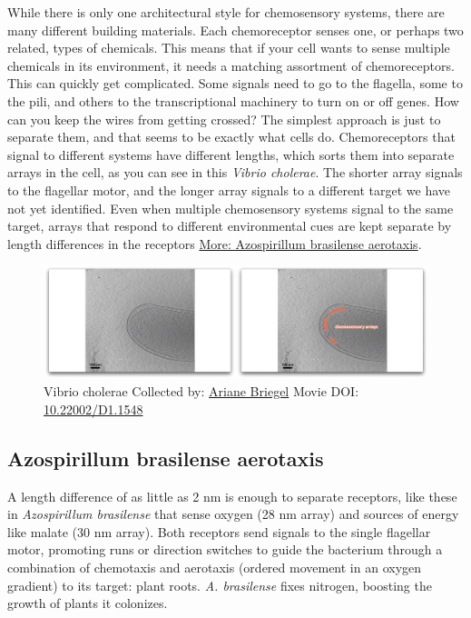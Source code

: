 \documentclass[]{tufte-book}
\begin{document}
While there is only one architectural style for chemosensory systems,
there are many different building materials. Each chemoreceptor senses
one, or perhaps two related, types of chemicals. This means that if your
cell wants to sense multiple chemicals in its environment, it needs a
matching assortment of chemoreceptors. This can quickly get complicated.
Some signals need to go to the flagella, some to the pili, and others to
the transcriptional machinery to turn on or off genes. How can you keep
the wires from getting crossed? The simplest approach is just to
separate them, and that seems to be exactly what cells do.
Chemoreceptors that signal to different systems have different lengths,
which sorts them into separate arrays in the cell, as you can see in
this \emph{Vibrio cholerae}. The shorter array signals to the flagellar
motor, and the longer array signals to a different target we have not
yet identified. Even when multiple chemosensory systems signal to the
same target, arrays that respond to different environmental cues are
kept separate by length differences in the receptors
\protect\hyperlink{Azospirillum_brasilense_aerotaxis}{More: Azospirillum
brasilense aerotaxis}.





\begin{figure}
\includegraphics{movie_stills/7_4} \caption[Vibrio cholerae Collected by:
\protect\hyperlink{ariane_briegel}{Ariane Briegel} Movie DOI:
\href{https://doi.org/10.22002/D1.1548}{10.22002/D1.1548}]{Vibrio cholerae Collected by:
\protect\hyperlink{ariane_briegel}{Ariane Briegel} Movie DOI:
\href{https://doi.org/10.22002/D1.1548}{10.22002/D1.1548}}\label{fig:7-4}
\end{figure}

\hypertarget{Azospirillum_brasilense_aerotaxis}{\subsection{Azospirillum
brasilense aerotaxis}\label{Azospirillum_brasilense_aerotaxis}}

A length difference of as little as 2 nm is enough to separate
receptors, like these in \emph{Azospirillum brasilense} that sense
oxygen (28 nm array) and sources of energy like malate (30 nm array).
Both receptors send signals to the single flagellar motor, promoting
runs or direction switches to guide the bacterium through a combination
of chemotaxis and aerotaxis (ordered movement in an oxygen gradient) to
its target: plant roots. \emph{A. brasilense} fixes nitrogen, boosting
the growth of plants it colonizes.
\end{document}
